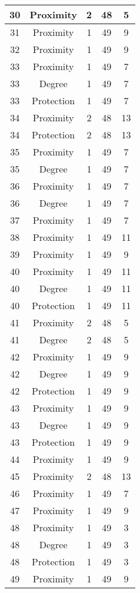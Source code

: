 \documentclass[results.tex]{subfiles}
\begin{document}
\begin{center}
\begin{tabular}{| c || c | c | c | c |}
    \hline
    30 & Proximity & 2 & 48 & 5 \\ 
    \hline
    31 & Proximity & 1 & 49 & 9 \\ 
    \hline
    32 & Proximity & 1 & 49 & 9 \\ 
    \hline
    33 & Proximity & 1 & 49 & 7 \\ 
    \hline
    33 & Degree & 1 & 49 & 7 \\ 
    \hline
    33 & Protection & 1 & 49 & 7 \\ 
    \hline
    34 & Proximity & 2 & 48 & 13 \\ 
    \hline
    34 & Protection & 2 & 48 & 13 \\ 
    \hline
    35 & Proximity & 1 & 49 & 7 \\ 
    \hline
    35 & Degree & 1 & 49 & 7 \\ 
    \hline
    36 & Proximity & 1 & 49 & 7 \\ 
    \hline
    36 & Degree & 1 & 49 & 7 \\ 
    \hline
    37 & Proximity & 1 & 49 & 7 \\ 
    \hline
    38 & Proximity & 1 & 49 & 11 \\ 
    \hline
    39 & Proximity & 1 & 49 & 9 \\ 
    \hline
    40 & Proximity & 1 & 49 & 11 \\ 
    \hline
    40 & Degree & 1 & 49 & 11 \\ 
    \hline
    40 & Protection & 1 & 49 & 11 \\ 
    \hline
    41 & Proximity & 2 & 48 & 5 \\ 
    \hline
    41 & Degree & 2 & 48 & 5 \\ 
    \hline
    42 & Proximity & 1 & 49 & 9 \\ 
    \hline
    42 & Degree & 1 & 49 & 9 \\ 
    \hline
    42 & Protection & 1 & 49 & 9 \\ 
    \hline
    43 & Proximity & 1 & 49 & 9 \\ 
    \hline
    43 & Degree & 1 & 49 & 9 \\ 
    \hline
    43 & Protection & 1 & 49 & 9 \\ 
    \hline
    44 & Proximity & 1 & 49 & 9 \\ 
    \hline
    45 & Proximity & 2 & 48 & 13 \\ 
    \hline
    46 & Proximity & 1 & 49 & 7 \\ 
    \hline
    47 & Proximity & 1 & 49 & 9 \\ 
    \hline
    48 & Proximity & 1 & 49 & 3 \\ 
    \hline
    48 & Degree & 1 & 49 & 3 \\ 
    \hline
    48 & Protection & 1 & 49 & 3 \\ 
    \hline
    49 & Proximity & 1 & 49 & 9 \\ 
    \hline   \end{tabular}
\end{center}
\end{document}
